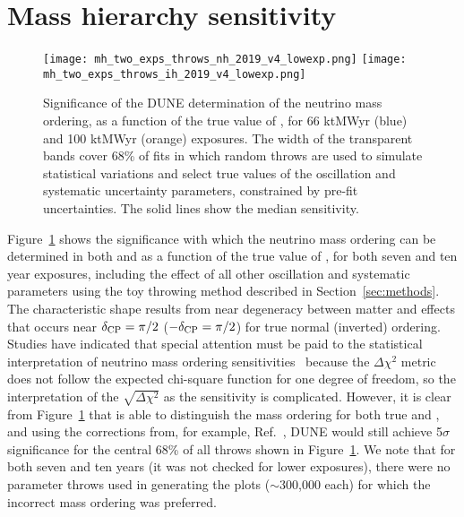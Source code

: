 \section{Mass hierarchy sensitivity}
\label{sec:mh_sens}

\begin{figure}[htbp]
  \centering
  \texttt{[image: mh\_two\_exps\_throws\_nh\_2019\_v4\_lowexp.png]}
  \texttt{[image: mh\_two\_exps\_throws\_ih\_2019\_v4\_lowexp.png]}
  \caption{Significance of the DUNE determination of the neutrino mass ordering, as a function of the true value of \deltacp, for 66 ktMWyr (blue) and 100 ktMWyr (orange) exposures. The width of the transparent bands cover 68\% of fits in which random throws are used to simulate statistical variations and select true values of the oscillation and systematic uncertainty parameters, constrained by pre-fit uncertainties. The solid lines show the median sensitivity.}
  \label{fig:mh_nominal}
\end{figure}
Figure~\ref{fig:mh_nominal} shows the significance with which the neutrino mass ordering can be determined in both  and  as a function of the true value of \deltacp, for both seven and ten year exposures, including the effect of all other oscillation and systematic parameters using the toy throwing method described in Section~\ref{sec:methods}. The characteristic shape results from near degeneracy between matter and  effects that occurs near $\delta_{\rm CP}=\pi/2$ ($-\delta_{\rm CP}=\pi/2$) for true normal (inverted) ordering. Studies have indicated that special attention must be paid to the statistical interpretation of neutrino mass ordering sensitivities~\cite{Ciuffoli:2013rza,Qian:2012zn,Blennow:2013oma} because the $\Delta\chi^2$ metric does not follow the expected chi-square function for one degree of freedom, so the interpretation of the $\sqrt{\Delta \chi^{2}}$ as the sensitivity is complicated. However, it is clear from Figure~\ref{fig:mh_nominal} that  is able to distinguish the mass ordering for both true  and , and using the corrections from, for example, Ref.~\cite{Ciuffoli:2013rza}, DUNE would still achieve 5$\sigma$ significance for the central 68\% of all throws shown in Figure~\ref{fig:mh_nominal}. We note that for both seven and ten years (it was not checked for lower exposures), there were no parameter throws used in generating the plots ($\sim$300,000 each) for which the incorrect mass ordering was preferred.

